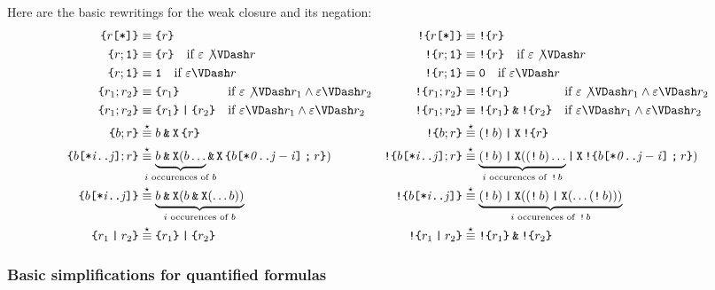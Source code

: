 \documentclass[a4paper,twoside,10pt,DIV=12]{scrreprt}
\DeclareMathOperator{\X}{\texttt{X}}
\newcommand{\M}{\mathbin{\texttt{M}}}
\newcommand{\W}{\mathbin{\texttt{W}}}
\DeclareMathOperator{\NOT}{\texttt{!}}
\newcommand{\OR}{\mathbin{\texttt{|}}}
\newcommand{\AND}{\mathbin{\texttt{\&}}}
\newcommand{\CONCAT}{\mathbin{\texttt{;}}}
\newcommand{\0}{\texttt{0}}
\newcommand{\1}{\texttt{1}}
\newcommand{\STAR}[1]{\texttt{[*#1]}}
\newcommand{\sere}[1]{\texttt{\{}#1\texttt{\}}}
\newcommand{\nsere}[1]{\texttt{!\{}#1\texttt{\}}}
\newcommand{\equiV}{\stackrel{\star}{\equiv}}
\def\clap#1{\hbox to 0pt{\hss#1\hss}}
\def\mathclap{\mathpalette\mathclapinternal}
\def\mathclapinternal#1#2{%
           \clap{$\mathsurround=0pt#1{#2}$}}
\newcommand\mvar[1]{\ensuremath{\mathit{#1}}}
\begin{document}
Here are the basic rewritings for the weak closure and its negation:
\begin{align*}
  \sere{r\STAR{}}&\equiv \sere{r}&
  \nsere{r\STAR{}}&\equiv \nsere{r}\\
  \sere{r;\1}&\equiv \sere{r} \quad\text{if~}\varepsilon\not\VDash r&
  \nsere{r;\1}&\equiv \nsere{r} \quad\text{if~}\varepsilon\not\VDash r\\
  \sere{r;\1}&\equiv \1 \quad\text{if~}\varepsilon\VDash r&
  \nsere{r;\1}&\equiv \0 \quad\text{if~}\varepsilon\VDash r\\
  \sere{r_1;r_2}&\equiv \sere{r_1}\phantom{{}\OR\sere{r_2}}\quad\text{if~}\varepsilon\not\VDash r_1\land\varepsilon\VDash r_2&
  \nsere{r_1;r_2}&\equiv \nsere{r_1}\phantom{{}\AND\nsere{r_2}}\quad\text{if~}\varepsilon\not\VDash r_1\land\varepsilon\VDash r_2\\
  \sere{r_1;r_2}&\equiv \sere{r_1}\OR\sere{r_2}\quad\text{if~}\varepsilon\VDash r_1\land\varepsilon\VDash r_2&
  \nsere{r_1;r_2}&\equiv \nsere{r_1}\AND\nsere{r_2}\quad\text{if~}\varepsilon\VDash r_1\land\varepsilon\VDash r_2\\
  \sere{b;r}&\equiV b\AND\X\sere{r}&
  \nsere{b;r}&\equiV (\NOT b)\OR\X\nsere{r}\\
  \sere{b\STAR{\mvar{i}..\mvar{j}};r}&\equiV \underbrace{b\AND \X(b\ldots}_{\mathclap{i\text{~occurences of~}b}}\AND\X\sere{b\STAR{\mvar{0}..\mvar{j-i}}\CONCAT r})&
  \nsere{b\STAR{\mvar{i}..\mvar{j}};r}&\equiV \underbrace{(\NOT b)\OR \X((\NOT b)\ldots}_{\mathclap{i\text{~occurences of~}\NOT b}}\OR\X\nsere{b\STAR{\mvar{0}..\mvar{j-i}}\CONCAT r}) \\
  \sere{b\STAR{\mvar{i}..\mvar{j}}}&\equiV \underbrace{b\AND \X(b\AND \X(\ldots b))}_{i\text{~occurences of~}b}&
  \nsere{b\STAR{\mvar{i}..\mvar{j}}}&\equiV \underbrace{(\NOT b)\OR \X((\NOT b)\OR \X(\ldots(\NOT b)))}_{i\text{~occurences of~}\NOT b}\\
  \sere{r_1\OR r_2}&\equiV\sere{r_1}\OR\sere{r_2} &
  \nsere{r_1\OR r_2}&\equiV\nsere{r_1}\AND\nsere{r_2}
\end{align*}

\subsubsection{Basic simplifications for quantified formulas}
\end{document}
